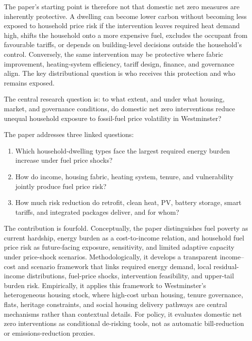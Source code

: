 The paper's starting point is therefore not that domestic net zero measures are inherently protective. A dwelling can become lower carbon without becoming less exposed to household price risk if the intervention leaves required heat demand high, shifts the household onto a more expensive fuel, excludes the occupant from favourable tariffs, or depends on building-level decisions outside the household's control. Conversely, the same intervention may be protective where fabric improvement, heating-system efficiency, tariff design, finance, and governance align. The key distributional question is who receives this protection and who remains exposed.

The central research question is: to what extent, and under what housing, market, and governance conditions, do domestic net zero interventions reduce unequal household exposure to fossil-fuel price volatility in Westminster?

The paper addresses three linked questions:
\begin{enumerate}[label=\arabic*.]
    \item Which household-dwelling types face the largest required energy burden increase under fuel price shocks?
    \item How do income, housing fabric, heating system, tenure, and vulnerability jointly produce fuel price risk?
    \item How much risk reduction do retrofit, clean heat, PV, battery storage, smart tariffs, and integrated packages deliver, and for whom?
\end{enumerate}

The contribution is fourfold. Conceptually, the paper distinguishes fuel poverty as current hardship, energy burden as a cost-to-income relation, and household fuel price risk as future-facing exposure, sensitivity, and limited adaptive capacity under price-shock scenarios. Methodologically, it develops a transparent income--cost and scenario framework that links required energy demand, local residual-income distributions, fuel-price shocks, intervention feasibility, and upper-tail burden risk. Empirically, it applies this framework to Westminster's heterogeneous housing stock, where high-cost urban housing, tenure governance, flats, heritage constraints, and social housing delivery pathways are central mechanisms rather than contextual details. For policy, it evaluates domestic net zero interventions as conditional de-risking tools, not as automatic bill-reduction or emissions-reduction proxies.

